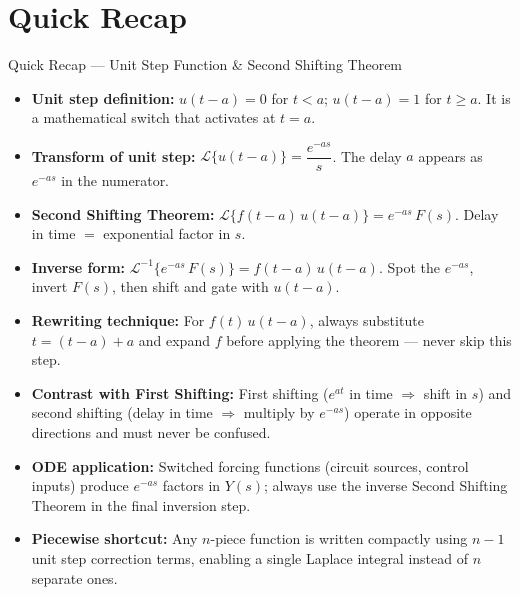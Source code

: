 \documentclass[12pt,a4paper]{article}
\begin{document}
\section{Quick Recap}

\begin{learnbox}{Quick Recap --- Unit Step Function \& Second Shifting Theorem}
\begin{itemize}
  \item \textbf{Unit step definition:} $u(t-a) = 0$ for $t < a$; $u(t-a) = 1$ for $t \geq a$.
    It is a mathematical switch that activates at $t = a$.
  \item \textbf{Transform of unit step:} $\mathcal{L}\{u(t-a)\} = \dfrac{e^{-as}}{s}$.
    The delay $a$ appears as $e^{-as}$ in the numerator.
  \item \textbf{Second Shifting Theorem:} $\mathcal{L}\{f(t-a)\,u(t-a)\} = e^{-as}\,F(s)$.
    Delay in time $=$ exponential factor in $s$.
  \item \textbf{Inverse form:} $\mathcal{L}^{-1}\{e^{-as}\,F(s)\} = f(t-a)\,u(t-a)$.
    Spot the $e^{-as}$, invert $F(s)$, then shift and gate with $u(t-a)$.
  \item \textbf{Rewriting technique:} For $f(t)\,u(t-a)$, always substitute $t = (t-a)+a$
    and expand $f$ before applying the theorem --- never skip this step.
  \item \textbf{Contrast with First Shifting:} First shifting ($e^{at}$ in time $\Rightarrow$ shift in $s$)
    and second shifting (delay in time $\Rightarrow$ multiply by $e^{-as}$) operate in
    opposite directions and must never be confused.
  \item \textbf{ODE application:} Switched forcing functions (circuit sources, control
    inputs) produce $e^{-as}$ factors in $Y(s)$; always use the inverse Second Shifting
    Theorem in the final inversion step.
  \item \textbf{Piecewise shortcut:} Any $n$-piece function is written compactly using
    $n-1$ unit step correction terms, enabling a single Laplace integral instead of $n$
    separate ones.
\end{itemize}
\end{learnbox}
\end{document}
